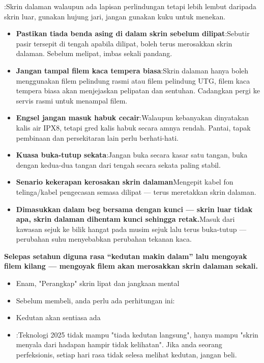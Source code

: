 
:Skrin dalaman walaupun ada lapisan perlindungan tetapi lebih lembut daripada skrin luar, gunakan hujung jari, jangan gunakan kuku untuk menekan.

\begin{itemize}
  \item \textbf{Pastikan tiada benda asing di dalam skrin sebelum dilipat}:Sebutir pasir tersepit di tengah apabila dilipat, boleh terus merosakkan skrin dalaman. Sebelum melipat, imbas sekali pandang.
  \item \textbf{Jangan tampal filem kaca tempera biasa}:Skrin dalaman hanya boleh menggunakan filem pelindung rasmi atau filem pelindung UTG, filem kaca tempera biasa akan menjejaskan pelipatan dan sentuhan. Cadangkan pergi ke servis rasmi untuk menampal filem.
  \item \textbf{Engsel jangan masuk habuk cecair}:Walaupun kebanyakan dinyatakan kalis air IPX8, tetapi gred kalis habuk secara amnya rendah. Pantai, tapak pembinaan dan persekitaran lain perlu berhati-hati.
  \item \textbf{Kuasa buka-tutup sekata}:Jangan buka secara kasar satu tangan, buka dengan kedua-dua tangan dari tengah secara sekata paling stabil.
  \item \textbf{Senario kekerapan kerosakan skrin dalaman}Mengepit kabel fon telinga/kabel pengecasan semasa dilipat — terus meretakkan skrin dalaman.
  \item \textbf{Dimasukkan dalam beg bersama dengan kunci — skrin luar tidak apa, skrin dalaman dihentam kunci sehingga retak.}Masuk dari kawasan sejuk ke bilik hangat pada musim sejuk lalu terus buka-tutup — perubahan suhu menyebabkan perubahan tekanan kaca.
\end{itemize}

\textbf{Selepas setahun diguna rasa “kedutan makin dalam” lalu mengoyak filem kilang — mengoyak filem akan merosakkan skrin dalaman sekali.}\par

\begin{itemize}
  \item Enam, "Perangkap" skrin lipat dan jangkaan mental
  \item Sebelum membeli, anda perlu ada perhitungan ini:
  \item Kedutan akan sentiasa ada
  \item :Teknologi 2025 tidak mampu "tiada kedutan langsung", hanya mampu "skrin menyala dari hadapan hampir tidak kelihatan". Jika anda seorang perfeksionis, setiap hari rasa tidak selesa melihat kedutan, jangan beli.
\end{itemize}

